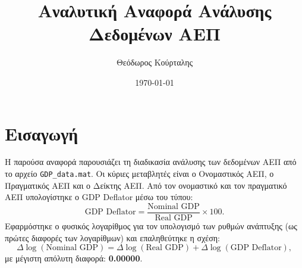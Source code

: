 \documentclass{article}
\title{Αναλυτική Αναφορά Ανάλυσης Δεδομένων ΑΕΠ}
\author{Θεόδωρος Κούρταλης}
\date{\today}
\begin{document}
\maketitle

\section{Εισαγωγή}
Η παρούσα αναφορά παρουσιάζει τη διαδικασία ανάλυσης των δεδομένων ΑΕΠ από το αρχείο \texttt{GDP\_data.mat}. Οι κύριες μεταβλητές είναι ο Ονομαστικός ΑΕΠ, ο Πραγματικός ΑΕΠ και ο Δείκτης ΑΕΠ. Από τον ονομαστικό και τον πραγματικό ΑΕΠ υπολογίστηκε ο GDP Deflator μέσω του τύπου:
\[
\text{GDP Deflator} = \frac{\text{Nominal GDP}}{\text{Real GDP}} \times 100.
\]
Εφαρμόστηκε ο φυσικός λογαρίθμος για τον υπολογισμό των ρυθμών ανάπτυξης (ως πρώτες διαφορές των λογαρίθμων) και επαληθεύτηκε η σχέση:
\[
\Delta \log(\text{Nominal GDP}) = \Delta \log(\text{Real GDP}) + \Delta \log(\text{GDP Deflator}),
\]
με μέγιστη απόλυτη διαφορά: \textbf{0.00000}. 
\end{document}
